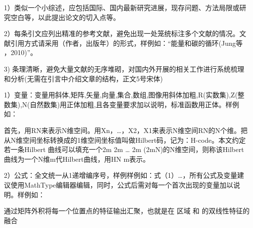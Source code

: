 \documentclass[]{my}
\begin{document}
\begin{multicols}{2}
    1）类似一个小综述，应包括国际、国内最新研究进展，现存问题、方法局限或研究空白等，以此提出论文的切入点等。


 2）每条引文应列出精准的参考文献，避免出现一处笼统标注多个文献的情况。文献引用方式请采用（作者，出版年）的形式，样例如：“能量和碳的循环(Jung等 ，2010)”。   



3) 条理清晰，避免大量文献的无序堆砌，对国内外开展的相关工作进行系统梳理和分析(无需在引言中介绍文章的结构，正文5号宋体)

1）变量：变量用斜体,矩阵,矢量,向量,集合,数组,图像用斜体加粗,R(实数集),Z(整数集),N(自然数集)用正体加粗,且各变量要求加以说明，标准函数用正体。样例如：


首先，用RN来表示N维空间。用Xn，…，X2，X1来表示N维空间RN的N个维。把从N维空间坐标转换成的1维空间坐标值叫做Hilbert码，记为：H-code。本文约定若一条Hilbert 曲线可以填充一个2m 2m … 2m (2mN)的N维空间，则称该Hilbert曲线为一个N维m代Hilbert曲线，用HN m表示。


2）公式：全文统一从1递增编序号，样例样例如：式（1）…，所有公式及变量建议使用MathType编辑器编辑，同时，公式后需对每一个首次出现的变量加以说明。样例如：


通过矩阵外积将每一个位置点的特征输出汇聚，也就是在 区域 和 的双线性特征的融合


\end{multicols}
\end{document}
